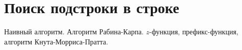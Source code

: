 \section{Поиск подстроки в строке}
Наивный алгоритм.
Алгоритм Рабина-Карпа.
$z$-функция, префикс-функция,
алгоритм Кнута-Морриса-Пратта.
